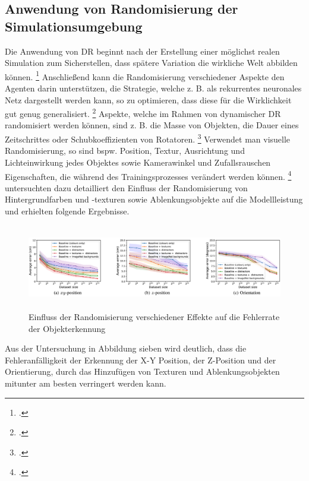 \subsection{Anwendung von Randomisierung der Simulationsumgebung}

Die Anwendung von DR beginnt nach der Erstellung einer möglichst realen Simulation zum Sicherstellen, dass spätere Variation die wirkliche Welt abbilden können. \footcite[Vgl.][S. 4]{Chen.2021}
Anschließend kann die Randomisierung verschiedener Aspekte den Agenten darin unterstützen, die Strategie, welche z. B. als rekurrentes neuronales Netz dargestellt werden kann, so zu optimieren, dass diese für die Wirklichkeit gut genug generalisiert. \footcite[Vgl.][S. 4]{Chen.2021}
Aspekte, welche im Rahmen von dynamischer DR randomisiert werden können, sind z. B. die Masse von Objekten, die Dauer eines Zeitschrittes oder Schubkoeffizienten von Rotatoren. \footcite[Vgl.][S. 4]{Molchanov.2019}
Verwendet man visuelle Randomisierung, so sind bspw. Position, Textur, Ausrichtung und Lichteinwirkung jedes Objektes sowie Kamerawinkel und Zufallsrauschen Eigenschaften, die während des Trainingsprozesses verändert werden können. \footcite[Vgl.][S. 3]{Tobin.2017}
\cite[]{Alghonaim.5302021652021} untersuchten dazu detailliert den Einfluss der Randomisierung von Hintergrundfarben und -texturen sowie Ablenkungsobjekte auf die Modellleistung und erhielten folgende Ergebnisse.

\begin{figure}[htb]
    \centering
    \includegraphics[height=3.7cm]{lib/graphics/influence_visual_randomness.png}
    \caption[Einfluss der Randomisierung verschiedener Effekte auf die Fehlerrate der Objekterkennung]{Einfluss der Randomisierung verschiedener Effekte auf die Fehlerrate der Objekterkennung\footnotemark}
    \label{abb:visual_randomization}
\end{figure}

Aus der Untersuchung in Abbildung sieben wird deutlich, dass die Fehleranfälligkeit der Erkennung der X-Y Position, der Z-Position und der Orientierung, durch das Hinzufügen von Texturen und Ablenkungsobjekten mitunter am besten verringert werden kann. 

